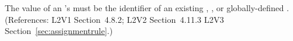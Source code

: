 The value of an \AssignmentRule's  must be the identifier
of an existing \Compartment, \Species, or globally-defined \Parameter.
(References: L2V1 Section~4.8.2; L2V2 Section~4.11.3 L2V3
Section~\ref{sec:assignmentrule}.)
